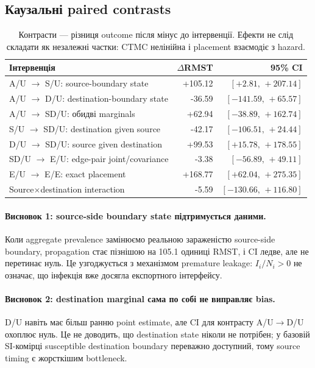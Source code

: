 \documentclass[11pt,a4paper]{article}
\newcommand{\CI}[2]{[#1,\,#2]}
\begin{document}
\subsection{Каузальні paired contrasts}
\begin{table}[H]\centering\small
\begin{tabular}{p{6.1cm}rr}
\toprule
Інтервенція & $\Delta$RMST & 95\% CI\\
\midrule
A/U $\to$ S/U: source-boundary state & +105.12 & $\CI{+2.81}{+207.14}$\\
A/U $\to$ D/U: destination-boundary state & -36.59 & $\CI{-141.59}{+65.57}$\\
A/U $\to$ SD/U: обидві marginals & +62.94 & $\CI{-38.89}{+162.74}$\\
S/U $\to$ SD/U: destination given source & -42.17 & $\CI{-106.51}{+24.44}$\\
D/U $\to$ SD/U: source given destination & +99.53 & $\CI{+15.78}{+178.55}$\\
SD/U $\to$ E/U: edge-pair joint/covariance & -3.38 & $\CI{-56.89}{+49.11}$\\
E/U $\to$ E/E: exact placement & +168.77 & $\CI{+62.04}{+275.35}$\\
Source$\times$destination interaction & -5.59 & $\CI{-130.66}{+116.80}$\\
\bottomrule
\end{tabular}
\caption{Контрасти --- різниця outcome після мінус до інтервенції. Ефекти не слід складати як незалежні частки: CTMC нелінійна і placement взаємодіє з hazard.}
\end{table}

\paragraph{Висновок 1: source-side boundary state підтримується даними.}
Коли aggregate prevalence замінюємо реальною зараженістю source-side boundary, propagation стає пізнішою на 105.1 одиниці RMST, і CI ледве, але не перетинає нуль. Це узгоджується з механізмом premature leakage: $I_i/N_i>0$ не означає, що інфекція вже досягла експортного інтерфейсу.

\paragraph{Висновок 2: destination marginal сама по собі не виправляє bias.}
D/U навіть має більш ранню point estimate, але CI для контрасту A/U$\to$D/U охоплює нуль. Це не доводить, що destination state ніколи не потрібен; у базовій SI-комірці susceptible destination boundary переважно доступний, тому source timing є жорсткішим bottleneck.
\end{document}
